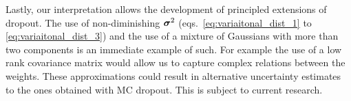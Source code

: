 \documentclass{article} %
\def\red#1{\textcolor{red}{#1}}
\newcommand{\bsigma}{\text{\boldmath$\sigma$}}
\theoremstyle{definition}
\begin{document}
Lastly, our interpretation allows the development of principled extensions of dropout. The use of non-diminishing $\bsigma^2$ (eqs.\ \eqref{eq:variaitonal_dist_1} to \eqref{eq:variaitonal_dist_3}) and the use of a mixture of Gaussians with more than two components is an immediate example of such. For example the use of a low rank covariance matrix would allow us to capture complex relations between the weights. These approximations could result in alternative uncertainty estimates to the ones obtained with MC dropout. This is subject to current research.

%
%
%
\end{document}

